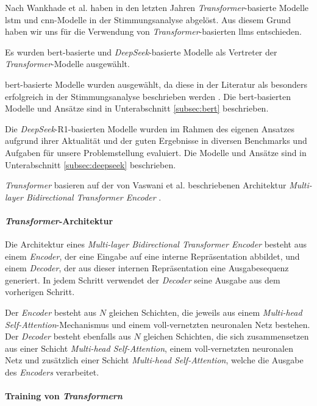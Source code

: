 Nach Wankhade et al. \cite{wankhade2022survey} haben in den letzten Jahren \textit{Transformer}-basierte Modelle \gls{lstm} und \gls{cnn}-Modelle in der Stimmungsanalyse abgelöst.
Aus diesem Grund haben wir uns für die Verwendung von \textit{Transformer}-basierten \glspl{llm} entschieden.

Es wurden \gls{bert}-basierte und \textit{DeepSeek}-basierte Modelle als Vertreter der \textit{Transformer}-Modelle ausgewählt.

\gls{bert}-basierte Modelle wurden ausgewählt, da diese in der Literatur als besonders erfolgreich in der Stimmungsanalyse beschrieben werden \cite{devlin2018bert}.
Die \gls{bert}-basierten Modelle und Ansätze sind in Unterabschnitt \ref{subsec:bert} beschrieben.

Die \textit{DeepSeek}-R1-basierten Modelle wurden im Rahmen des eigenen Ansatzes aufgrund ihrer Aktualität und der guten Ergebnisse in diversen Benchmarks und Aufgaben \cite{deepseekai2025deepseekr1incentivizingreasoningcapability} für unsere Problemstellung evaluiert.
Die Modelle und Ansätze sind in Unterabschnitt \ref{subsec:deepseek} beschrieben.

\textit{Transformer} basieren auf der von Vaswani et al. beschriebenen Architektur \textit{Multi-layer Bidirectional Transformer Encoder} \cite{vaswani2017attention}.

\paragraph{\textit{Transformer}-Architektur}
Die Architektur eines \textit{Multi-layer Bidirectional Transformer Encoder} besteht aus einem \textit{Encoder}, der eine Eingabe auf eine interne Repräsentation abbildet, und einem \textit{Decoder}, der aus dieser internen Repräsentation eine Ausgabesequenz generiert.
In jedem Schritt verwendet der \textit{Decoder} seine Ausgabe aus dem vorherigen Schritt.

Der \textit{Encoder} besteht aus $N$ gleichen Schichten, die jeweils aus einem \textit{Multi-head Self-Attention}-Mechanismus und einem voll-vernetzten neuronalen Netz bestehen.
Der \textit{Decoder} besteht ebenfalls aus $N$ gleichen Schichten, die sich zusammensetzen aus einer Schicht \textit{Multi-head Self-Attention}, einem voll-vernetzten neuronalen Netz und zusätzlich einer Schicht \textit{Multi-head Self-Attention}, welche die Ausgabe des \textit{Encoders} verarbeitet.

\paragraph{Training von \textit{Transformern}}

